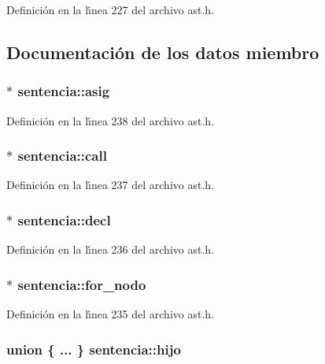Definici\'{o}n en la l\'{\i}nea 227 del archivo ast.h.

\subsection{Documentaci\'{o}n de los datos miembro}
\subsubsection{$\ast$ {\bf sentencia::asig}}\label{structsentencia_o8}




Definici\'{o}n en la l\'{\i}nea 238 del archivo ast.h.
\subsubsection{$\ast$ {\bf sentencia::call}}\label{structsentencia_o7}




Definici\'{o}n en la l\'{\i}nea 237 del archivo ast.h.
\subsubsection{$\ast$ {\bf sentencia::decl}}\label{structsentencia_o6}




Definici\'{o}n en la l\'{\i}nea 236 del archivo ast.h.
\subsubsection{$\ast$ {\bf sentencia::for\_\-nodo}}\label{structsentencia_o5}




Definici\'{o}n en la l\'{\i}nea 235 del archivo ast.h.
\subsubsection{\setlength{\rightskip}{0pt plus 5cm}union \{ ... \}  {\bf sentencia::hijo}}\label{structsentencia_o9}


